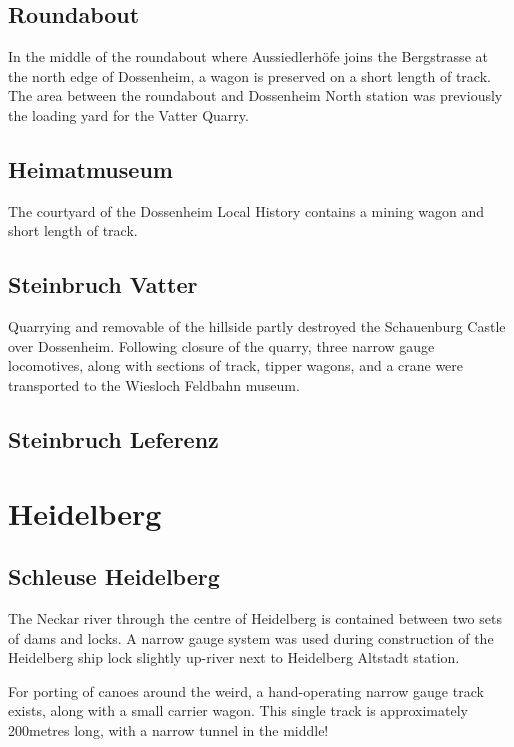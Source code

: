 \documentclass[a4paper]{report}
\begin{document}
\subsection{Roundabout}

In the middle of the roundabout where Aussiedlerhöfe joins the
Bergstrasse at the north edge of Dossenheim, a wagon is preserved on a
short length of track.  The area between the roundabout and Dossenheim
North station was previously the loading yard for the Vatter Quarry.

\subsection{Heimatmuseum}

The courtyard of the Dossenheim Local History contains a mining wagon and short length of track.

\subsection{Steinbruch Vatter}

Quarrying and removable of the hillside partly destroyed the
Schauenburg Castle over Dossenheim.  Following closure of the quarry, three narrow
gauge locomotives, along with sections of track, tipper wagons, and a
crane were transported to the Wiesloch Feldbahn museum.

\subsection{Steinbruch Leferenz}

\section{Heidelberg}

\subsection{Schleuse Heidelberg}

The Neckar river through the centre of Heidelberg is contained between
two sets of dams and locks.  A narrow gauge system was used during
construction of the Heidelberg ship lock slightly up-river next to
Heidelberg Altstadt station.

For porting of canoes around the weird, a hand-operating narrow gauge
track exists, along with a small carrier wagon.  This single track is
approximately 200metres long, with a narrow tunnel in the middle!
\end{document}
